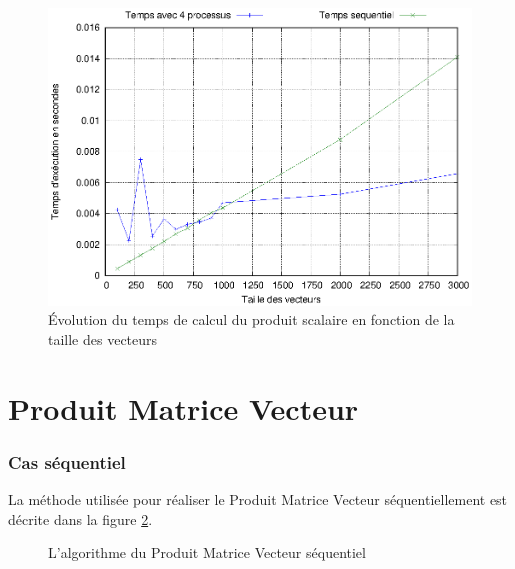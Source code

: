 \documentclass[a4paper]{article}
\begin{document}
\begin{figure}[h]
	\begin{center}
		\includegraphics[scale=0.80]{Courbes/produit_scal_croisement.eps}
	\end{center}
   	\caption{Évolution du temps de calcul du produit scalaire en fonction de la taille des vecteurs}
	\label{fig:courbe_ps2}
\end{figure}

\FloatBarrier

\part{Produit Matrice Vecteur}

\section{Cas séquentiel}

La méthode utilisée pour réaliser le Produit Matrice Vecteur séquentiellement est décrite dans la figure \ref{fig:algo_pmv}. \\

\begin{figure}[h]
	\caption{L'algorithme du Produit Matrice Vecteur séquentiel}%
	\label{fig:algo_pmv}%
\end{figure}
\end{document}
